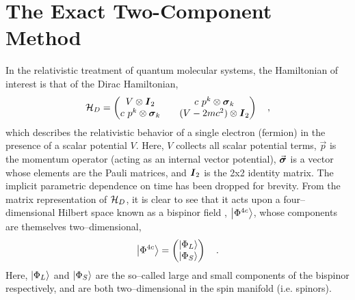 \section{The Exact Two-Component Method}
\label{sec:X2C}

In the relativistic treatment of quantum molecular systems, the Hamiltonian
of interest is that of the Dirac Hamiltonian,
\begin{equation}
\mathcal{H}_D = 
\begin{pmatrix}
  V \otimes \boldsymbol{I}_2 && c \text { } p^k \otimes \boldsymbol{\sigma}_k \\
  c \text { } p^k \otimes \boldsymbol{\sigma}_k && (V - 2mc^2) \otimes \boldsymbol{I}_2
\end{pmatrix} \quad ,
\label{eq:DiracHam}
\end{equation}
which describes the relativistic behavior of a single electron (fermion) in the
presence of a scalar potential $V$. Here, $V$ collects all scalar potential
terms, $\vec{p}$ is the momentum operator (acting as an internal vector
potential), $\vec{\boldsymbol{\sigma}}$ is a vector whose elements are the Pauli
matrices, and $\boldsymbol{I}_2$ is the 2x2 identity matrix. The implicit parametric
dependence on time has been dropped for brevity. 
From the matrix representation of $\mathcal{H}_D$, it is clear to see that it
acts upon a four--dimensional Hilbert space known as a bispinor field ,
$\left\vert \Phi^{4c} \right\rangle$, whose components are themselves two--dimensional,
\begin{equation}
\left\vert \Phi^{4c} \right\rangle = \begin{pmatrix}
 \left\vert \Phi_L \right\rangle \\ \left\vert \Phi_S \right\rangle
\end{pmatrix} \quad.
\end{equation}
Here, $\left\vert \Phi_L \right\rangle$ and $\left\vert \Phi_S \right\rangle$ are the so--called large and small
components of the bispinor respectively, and are both two--dimensional in the
spin manifold (i.e. spinors).

